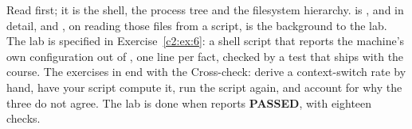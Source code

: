 Read  first; it is the shell, the process tree and the filesystem hierarchy.
 is ,  and  in detail, and ,
on reading those files from a script, is the background to the lab. The lab is
specified in Exercise~\ref{c2:ex:6}: a shell script that reports the machine's own configuration
out of , one  line per fact, checked by a test that ships with the
course. The exercises in  end with the Cross-check: derive a
context-switch rate by hand, have your script compute it, run the script again, and account for why
the three do not agree. The lab is done when  reports \textbf{PASSED}, with
eighteen checks.






